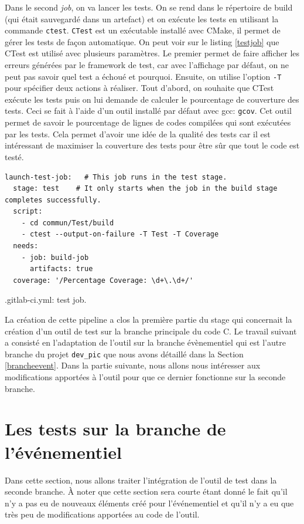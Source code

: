 \documentclass[a4paper]{article}
\begin{document}
Dans le second \textit{job}, on va lancer les tests. On se rend dans le
répertoire de build (qui était sauvegardé dans un artefact) et on exécute les tests
en utilisant la commande \verb|ctest|. \verb|CTest| est un exécutable
installé avec CMake, il permet de gérer les tests de façon automatique. On peut
voir sur le listing \ref{testjob} que CTest est utilisé avec plusieurs
paramètres. Le premier permet de faire afficher les erreurs générées par le
framework de test, car avec l'affichage par défaut, on ne peut pas savoir quel
test a échoué et pourquoi. Ensuite, on utilise l'option \verb|-T| pour spécifier
deux actions à réaliser. Tout d'abord, on souhaite que CTest exécute les tests
puis on lui demande de calculer le pourcentage de couverture des tests.
Ceci se fait à l'aide d'un outil installé par défaut avec gcc: \verb|gcov|. Cet
outil permet de savoir le pourcentage de lignes de codes compilées qui sont
exécutées par les tests. Cela permet d'avoir une idée de la qualité des tests
car il est intéressant de maximiser la couverture des tests pour être sûr que
tout le code est testé.

\begin{listing}[ht!]
\begin{verbatim}
launch-test-job:   # This job runs in the test stage.
  stage: test    # It only starts when the job in the build stage completes successfully.
  script:
    - cd commun/Test/build
    - ctest --output-on-failure -T Test -T Coverage
  needs:
    - job: build-job
      artifacts: true
  coverage: '/Percentage Coverage: \d+\.\d+/'
\end{verbatim}
\caption{.gitlab-ci.yml: test job.}
\label{testjob}
\end{listing}

La création de cette pipeline a clos la première partie du stage qui concernait
la création d'un outil de test sur la branche principale du code C. Le travail
suivant a consisté en l'adaptation de l'outil sur la branche évènementiel qui
est l'autre branche du projet \verb|dev_pic| que nous avons détaillé dans la
Section \ref{brancheevent}. Dans la partie suivante, nous allons nous intéresser
aux modifications apportées à l'outil pour que ce dernier fonctionne sur la
seconde branche.
\section{Les tests sur la branche de l'événementiel}%

Dans cette section, nous allons traiter l'intégration de l'outil de test dans la
seconde branche. À noter que cette section sera courte étant donné le fait qu'il
n'y a pas eu de nouveaux éléments créé pour l'événementiel et qu'il n'y a eu que
très peu de modifications apportées au code de l'outil.
\end{document}
